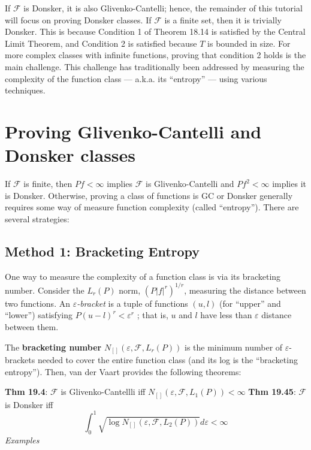 \documentclass[
]{article}
\begin{document}
If \(\mathcal{F}\) is Donsker, it is also Glivenko-Cantelli; hence, the
remainder of this tutorial will focus on proving Donsker classes. If
\(\mathcal{F}\) is a finite set, then it is trivially Donsker. This is
because Condition 1 of Theorem 18.14 is satisfied by the Central Limit
Theorem, and Condition 2 is satisfied because \(T\) is bounded in size.
For more complex classes with infinite functions, proving that condition
2 holds is the main challenge. This challenge has traditionally been
addressed by measuring the complexity of the function class --- a.k.a.
its ``entropy'' --- using various techniques.

\section{Proving Glivenko-Cantelli and Donsker
classes}\label{proving-glivenko-cantelli-and-donsker-classes}

If \(\mathcal{F}\) is finite, then \(Pf < \infty\) implies
\(\mathcal{F}\) is Glivenko-Cantelli and \(Pf^2 < \infty\) implies it is
Donsker. Otherwise, proving a class of functions is GC or Donsker
generally requires some way of measure function complexity (called
``entropy''). There are several strategies:

\subsection{Method 1: Bracketing
Entropy}\label{method-1-bracketing-entropy}

One way to measure the complexity of a function class is via its
bracketing number. Consider the \(L_r(P)\) norm, \((P|f|^r)^{1/r}\),
measuring the distance between two functions. An
\emph{\(\varepsilon\)-bracket} is a tuple of functions \((u, l)\) (for
``upper'' and ``lower'') satisfying \(P(u -l)^r < \varepsilon^r\) ; that
is, \(u\) and \(l\) have less than \(\varepsilon\) distance between
them.

The \textbf{bracketing number}
\(N_{[]}(\varepsilon, \mathcal{F}, L_r(P))\) is the minimum number of
\(\varepsilon\)-brackets needed to cover the entire function class (and
its log is the ``bracketing entropy''). Then, van der Vaart provides the
following theorems:

\textbf{Thm 19.4}: \(\mathcal{F}\) is Glivenko-Cantellli iff
\(N_{[]}(\varepsilon, \mathcal{F}, L_1(P)) < \infty\) \textbf{Thm
19.45}: \(\mathcal{F}\) is Donsker iff
\[\int_{0}^{1}\sqrt{\log N_{[]}(\varepsilon, \mathcal{F}, L_2(P))}d\varepsilon < \infty\]
\emph{Examples} 
\end{document}
